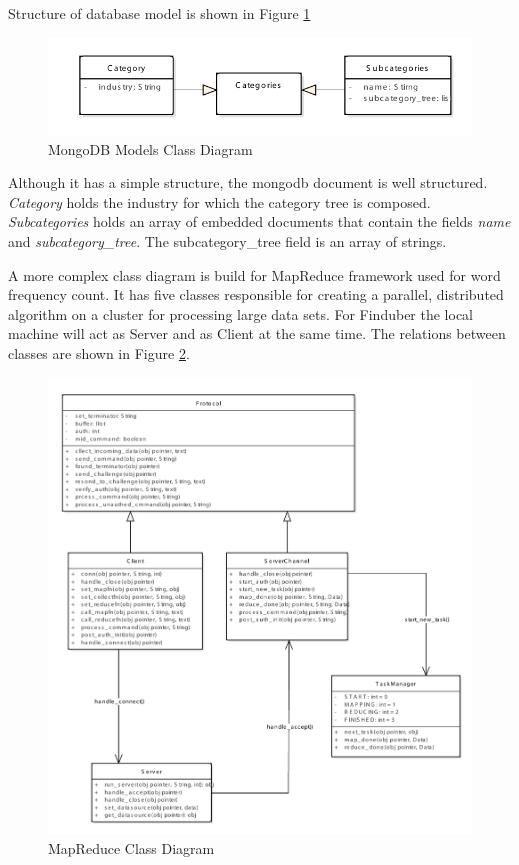 Structure of database model is shown in Figure \ref{classMongo_uml}

\begin{figure}[!ht]
\centering
\includegraphics[width=15cm]{MongoDB}
\caption{MongoDB Models Class Diagram}\label{classMongo_uml}
\end{figure}

Although it has a simple structure, the mongodb document is well structured. \textit{Category} holds the industry for which the category tree is composed. \textit{Subcategories} holds an array of embedded documents that contain the fields \textit{name} and \textit{subcategory\_tree}. The subcategory\_tree field is an array of strings. 

A more complex class diagram is build for MapReduce framework used for word frequency count. It has five classes responsible for creating a parallel, distributed algorithm on a cluster for processing large data sets. For Finduber the local machine will act as Server and as Client at the same time. The relations between classes are shown in Figure \ref{hadoop_uml}.

\begin{figure}[!ht]
\centering
\includegraphics[width=15cm]{hadoop}
\caption{MapReduce Class Diagram}\label{hadoop_uml}
\end{figure}


